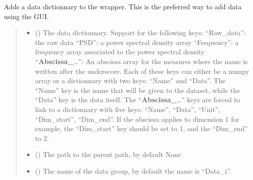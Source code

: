 \documentclass[letterpaper,10pt,english]{sphinxmanual}
\begin{document}
\begin{fulllineitems}
\begin{fulllineitems}
\label{\detokenize{_autosummary/HDF5_BLS.wrapper:HDF5_BLS.wrapper.Wrapper.add_dictionnary}}
\pysigstartsignatures
\pysiglinewithargsret
{}
{\sphinxparamcomma {}\sphinxparamcomma {}\sphinxparamcomma {}\sphinxparamcomma {}}
{}
\pysigstopsignatures
\sphinxAtStartPar
Adds a data dictionnary to the wrapper. This is the preferred way to add data using the GUI.
\begin{quote}\begin{description}
\begin{itemize}
\item {} 
\sphinxAtStartPar
{} () \textendash{} The data dictionnary. Support for the following keys:
\sphinxhyphen{} “Raw\_data”: the raw data
\sphinxhyphen{} “PSD”: a power spectral density array
\sphinxhyphen{} “Frequency”: a frequency array associated to the power spectral density
\sphinxhyphen{} “{\color{red}\bfseries{}Abscissa\_}…”: An abscissa array for the measures where the name is written after the underscore.
Each of these keys can either be a numpy array or a dictionnary with two keys: “Name” and “Data”. The “Name” key is the name that will be given to the dataset, while the “Data” key is the data itself.
The “{\color{red}\bfseries{}Abscissa\_}…” keys are forced to link to a dictionnary with five keys: “Name”, “Data”, “Unit”, “Dim\_start”, “Dim\_end”. If the abscissa applies to dimension 1 for example, the “Dim\_start” key should be set to 1, and the “Dim\_end” to 2.

\item {} 
\sphinxAtStartPar
{} (\sphinxstyleliteralemphasis{\sphinxupquote{, }}) \textendash{} The path to the parent path, by default None

\item {} 
\sphinxAtStartPar
{} (\sphinxstyleliteralemphasis{\sphinxupquote{, }}) \textendash{} The name of the data group, by default the name is “Data\_i”.


\end{itemize}
\end{description}
\end{quote}
\end{fulllineitems}
\end{fulllineitems}
\end{document}
